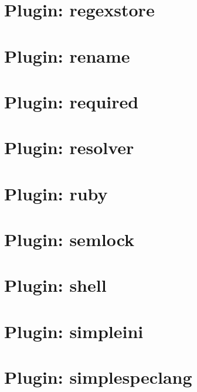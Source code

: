 \documentclass[twoside]{book}
\newcommand{\+}{\discretionary{\mbox{\scriptsize$\hookleftarrow$}}{}{}}
\begin{document}
\chapter{Plugin\+: regexstore}
\label{md_src_plugins_regexstore_README}

\chapter{Plugin\+: rename}
\label{md_src_plugins_rename_README}

\chapter{Plugin\+: required}
\label{md_src_plugins_required_README}

\chapter{Plugin\+: resolver}
\label{md_src_plugins_resolver_README}

\chapter{Plugin\+: ruby}
\label{md_src_plugins_ruby_README}

\chapter{Plugin\+: semlock}
\label{md_src_plugins_semlock_README}

\chapter{Plugin\+: shell}
\label{md_src_plugins_shell_README}

\chapter{Plugin\+: simpleini}
\label{md_src_plugins_simpleini_README}

\chapter{Plugin\+: simplespeclang}
\label{md_src_plugins_simplespeclang_README}

\end{document}
